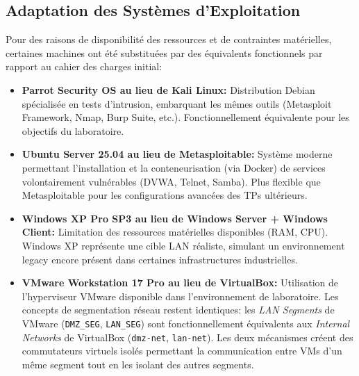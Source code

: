\documentclass[12pt,a4paper,openany]{report}
\begin{document}
	
	\subsection{Adaptation des Systèmes d'Exploitation}
	\label{subsec:adaptation-os}
	
	Pour des raisons de disponibilité des ressources et de contraintes matérielles, 
	certaines machines ont été substituées par des équivalents fonctionnels 
	par rapport au cahier des charges initial:
	
	\begin{itemize}
		\item \textbf{Parrot Security OS au lieu de Kali Linux:} 
		Distribution Debian spécialisée en tests d'intrusion, embarquant 
		les mêmes outils (Metasploit Framework, Nmap, Burp Suite, etc.). 
		Fonctionnellement équivalente pour les objectifs du laboratoire.
		
		\item \textbf{Ubuntu Server 25.04 au lieu de Metasploitable:} 
		Système moderne permettant l'installation et la conteneurisation 
		(via Docker) de services volontairement vulnérables (DVWA, Telnet, Samba). 
		Plus flexible que Metasploitable pour les configurations avancées 
		des TPs ultérieurs.
		
		\item \textbf{Windows XP Pro SP3 au lieu de Windows Server + Windows Client:} 
		Limitation des ressources matérielles disponibles (RAM, CPU). 
		Windows XP représente une cible LAN réaliste, simulant un environnement 
		legacy encore présent dans certaines infrastructures industrielles.
		
		
		\item \textbf{VMware Workstation 17 Pro au lieu de VirtualBox:}
		Utilisation de l'hyperviseur VMware disponible dans l'environnement 
		de laboratoire. Les concepts de segmentation réseau restent identiques: 
		les \textit{LAN Segments} de VMware (\texttt{DMZ\_SEG}, \texttt{LAN\_SEG}) 
		sont fonctionnellement équivalents aux \textit{Internal Networks} de 
		VirtualBox (\texttt{dmz-net}, \texttt{lan-net}). Les deux mécanismes 
		créent des commutateurs virtuels isolés permettant la communication 
		entre VMs d'un même segment tout en les isolant des autres segments.
		
	\end{itemize}
	
\end{document}
